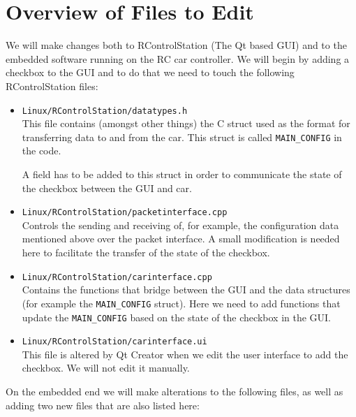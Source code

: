 \documentclass[12pt]{article} %
\begin{document}
\section{Overview of Files to Edit} 

We will make changes both to RControlStation (The Qt based GUI) and to
the embedded software running on the RC car controller. We will begin
by adding a checkbox to the GUI and to do that we need to touch the
following RControlStation files:

\begin{itemize}
\item {\verb!Linux/RControlStation/datatypes.h!} \\ This file contains
  (amongst other things) the C struct used as the format for
  transferring data to and from the car. This struct is called
  {\verb!MAIN_CONFIG!} in the code.

  A field has to be added to this struct in order to communicate the
  state of the checkbox between the GUI and car.
  
\item {\verb!Linux/RControlStation/packetinterface.cpp!} \\ Controls
  the sending and receiving of, for example, the configuration data
  mentioned above over the packet interface. A small modification is
  needed here to facilitate the transfer of the state of the checkbox.
  
\item {\verb!Linux/RControlStation/carinterface.cpp!} \\ Contains the
  functions that bridge between the GUI and the data structures (for
  example the {\verb!MAIN_CONFIG!} struct). Here we need to add
  functions that update the {\verb!MAIN_CONFIG!} based on the state of
  the checkbox in the GUI.
\item {\verb!Linux/RControlStation/carinterface.ui!} \\
  This file is altered by Qt Creator when we edit the user interface to add the
  checkbox. We will not edit it manually. 
\end{itemize}

On the embedded end we will make alterations to the following files,
as well as adding two new files that are also listed here: 
\end{document}
